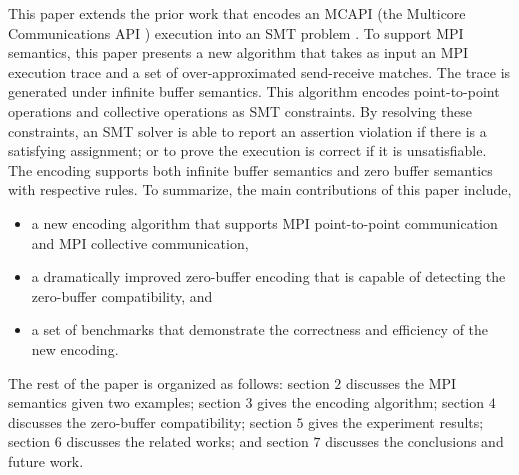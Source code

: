 This paper extends the prior work that encodes an MCAPI (the Multicore Communications API \cite{mcapi}) execution into an SMT problem \cite{DBLP:conf/kbse/HuangMM13}. To support MPI semantics, this paper presents a new algorithm that takes as input an MPI execution trace and a set of over-approximated send-receive matches. The trace is generated under infinite buffer semantics. This algorithm encodes point-to-point operations and collective operations as SMT constraints. By resolving these constraints, an SMT solver is able to report an assertion violation if there is a satisfying assignment; or to prove the execution is correct if it is unsatisfiable. The encoding supports both infinite buffer semantics and zero buffer semantics with respective rules. To summarize, the main contributions of this paper include,
\begin{itemize}
\item a new encoding algorithm that supports MPI point-to-point communication and MPI collective communication,
\item a dramatically improved zero-buffer encoding that is capable of detecting the zero-buffer compatibility, and
\item a set of benchmarks that demonstrate the correctness and efficiency of the new encoding.
\end{itemize}

The rest of the paper is organized as follows: section $2$ discusses the MPI semantics given two examples; section $3$ gives the encoding algorithm; section $4$ discusses the zero-buffer compatibility; section $5$ gives the experiment results; section $6$ discusses the related works; and section $7$ discusses the conclusions and future work.

\examplefigone


           